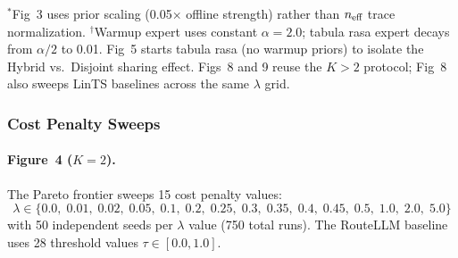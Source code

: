 \begin{table}[h]
\centering
\caption{LinUCB expert parameters by experiment.}
\label{tab:linucb_expt}
\small
{}
\vspace{0.3em}

\footnotesize
$^*$Fig~3 uses prior scaling (0.05$\times$ offline strength) rather than $n_{\text{eff}}$ trace normalization.
$^\dagger$Warmup expert uses constant $\alpha{=}2.0$; tabula rasa expert decays from $\alpha/2$ to 0.01.
Fig~5 starts tabula rasa (no warmup priors) to isolate the Hybrid vs.\ Disjoint sharing effect.
Figs~8 and 9 reuse the $K{>}2$ protocol; Fig~8 also sweeps LinTS baselines across the same $\lambda$ grid.
\end{table}

\subsubsection{Cost Penalty Sweeps}

\paragraph{Figure~4 ($K{=}2$).}
The Pareto frontier sweeps 15 cost penalty values:
\begin{equation*}
\lambda \in \{0.0,\; 0.01,\; 0.02,\; 0.05,\; 0.1,\; 0.2,\; 0.25,\; 0.3,\; 0.35,\; 0.4,\; 0.45,\; 0.5,\; 1.0,\; 2.0,\; 5.0\}
\end{equation*}
with 50 independent seeds per $\lambda$ value (750 total runs).
The RouteLLM baseline uses 28 threshold values $\tau \in [0.0, 1.0]$.

